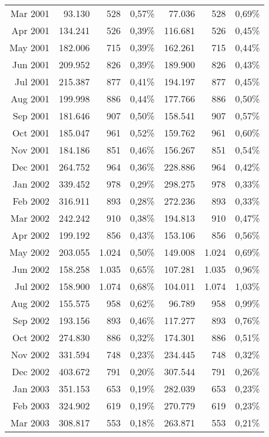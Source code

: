 \begin{longtable}{r|rrr|rrr}
Mar 2001 & 93.130  & 528   & 0,57\% & 77.036  & 528   & 0,69\% \\
Apr 2001 & 134.241 & 526   & 0,39\% & 116.681 & 526   & 0,45\% \\
May 2001 & 182.006 & 715   & 0,39\% & 162.261 & 715   & 0,44\% \\
Jun 2001 & 209.952 & 826   & 0,39\% & 189.900 & 826   & 0,43\% \\
Jul 2001 & 215.387 & 877   & 0,41\% & 194.197 & 877   & 0,45\% \\
Aug 2001 & 199.998 & 886   & 0,44\% & 177.766 & 886   & 0,50\% \\
Sep 2001 & 181.646 & 907   & 0,50\% & 158.541 & 907   & 0,57\% \\
Oct 2001 & 185.047 & 961   & 0,52\% & 159.762 & 961   & 0,60\% \\
Nov 2001 & 184.186 & 851   & 0,46\% & 156.267 & 851   & 0,54\% \\
Dec 2001 & 264.752 & 964   & 0,36\% & 228.886 & 964   & 0,42\% \\
Jan 2002 & 339.452 & 978   & 0,29\% & 298.275 & 978   & 0,33\% \\
Feb 2002 & 316.911 & 893   & 0,28\% & 272.236 & 893   & 0,33\% \\
Mar 2002 & 242.242 & 910   & 0,38\% & 194.813 & 910   & 0,47\% \\
Apr 2002 & 199.192 & 856   & 0,43\% & 153.106 & 856   & 0,56\% \\
May 2002 & 203.055 & 1.024 & 0,50\% & 149.008 & 1.024 & 0,69\% \\
Jun 2002 & 158.258 & 1.035 & 0,65\% & 107.281 & 1.035 & 0,96\% \\
Jul 2002 & 158.900 & 1.074 & 0,68\% & 104.011 & 1.074 & 1,03\% \\
Aug 2002 & 155.575 & 958   & 0,62\% & 96.789  & 958   & 0,99\% \\
Sep 2002 & 193.156 & 893   & 0,46\% & 117.277 & 893   & 0,76\% \\
Oct 2002 & 274.830 & 886   & 0,32\% & 174.301 & 886   & 0,51\% \\
Nov 2002 & 331.594 & 748   & 0,23\% & 234.445 & 748   & 0,32\% \\
Dec 2002 & 403.672 & 791   & 0,20\% & 307.544 & 791   & 0,26\% \\
Jan 2003 & 351.153 & 653   & 0,19\% & 282.039 & 653   & 0,23\% \\
Feb 2003 & 324.902 & 619   & 0,19\% & 270.779 & 619   & 0,23\% \\
Mar 2003 & 308.817 & 553   & 0,18\% & 263.871 & 553   & 0,21\% \\

\end{longtable}
